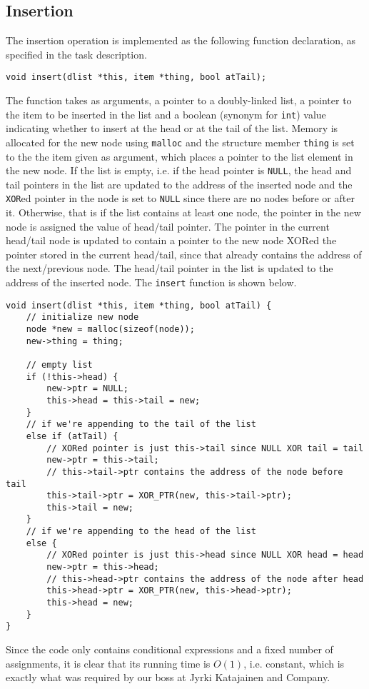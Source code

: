 \documentclass[11pt]{article}
\newcommand{\code}[1]{{\tt #1}}
\begin{document}
\subsection{Insertion}
The insertion operation is implemented as the following function declaration, as
specified in the task description.
\begin{lstlisting}
void insert(dlist *this, item *thing, bool atTail);
\end{lstlisting}
The function takes as arguments, a pointer to a doubly-linked list, a pointer to
the item to be inserted in the list and a boolean (synonym for \code{int}) value
indicating whether to insert at the head or at the tail of the list.
Memory is allocated for the new node using \code{malloc} and the structure
member \code{thing} is set to the the item given as argument, which places a
pointer to the list element in the new node. If the list is empty, i.e. if the
head pointer is \code{NULL}, the head and tail pointers in the list are updated
to the address of the inserted node and the \verb|XOR|ed pointer in the node is set to
\code{NULL} since there are no nodes before or after it. Otherwise, that is if
the list contains at least one node, the pointer in the new node is assigned the
value of head/tail pointer. The pointer in the current head/tail node is updated
to contain a pointer to the new node XORed the pointer stored in the current
head/tail, since that already contains the address of the next/previous node.
The head/tail pointer in the list is updated to the address of the inserted
node. The \code{insert} function is shown below.
\begin{lstlisting}
void insert(dlist *this, item *thing, bool atTail) {
    // initialize new node
    node *new = malloc(sizeof(node));
    new->thing = thing;

    // empty list
    if (!this->head) {
        new->ptr = NULL;
        this->head = this->tail = new;
    }
    // if we're appending to the tail of the list
    else if (atTail) {
        // XORed pointer is just this->tail since NULL XOR tail = tail
        new->ptr = this->tail;
        // this->tail->ptr contains the address of the node before tail
        this->tail->ptr = XOR_PTR(new, this->tail->ptr);
        this->tail = new;
    }
    // if we're appending to the head of the list
    else {
        // XORed pointer is just this->head since NULL XOR head = head
        new->ptr = this->head;
        // this->head->ptr contains the address of the node after head
        this->head->ptr = XOR_PTR(new, this->head->ptr);
        this->head = new;
    }
}
\end{lstlisting}
Since the code only contains conditional expressions and a fixed number of
assignments, it is clear that its running time is \(O(1)\), i.e. constant, which
is exactly what was required by our boss at Jyrki Katajainen and Company.
\end{document}
